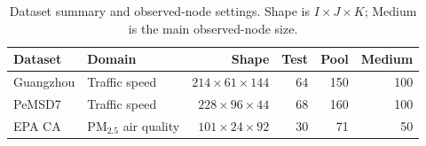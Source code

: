 \begin{table}[htbp]
\centering
\caption{Dataset summary and observed-node settings. Shape is $I\times J\times K$; Medium is the main observed-node size.}
\label{tab:experimental_design_datasets}
\TableFont
\setlength{\tabcolsep}{3.6pt}
\begin{tabular}{llrrrr}
\toprule
\rowcolor{TableHeader}
Dataset & Domain & Shape & Test & Pool & Medium \\
\midrule
Guangzhou & Traffic speed & $214\times61\times144$ & 64 & 150 & 100 \\
PeMSD7 & Traffic speed & $228\times96\times44$ & 68 & 160 & 100 \\
EPA CA & PM$_{2.5}$ air quality & $101\times24\times92$ & 30 & 71 & 50 \\
\bottomrule
\end{tabular}
\end{table}
